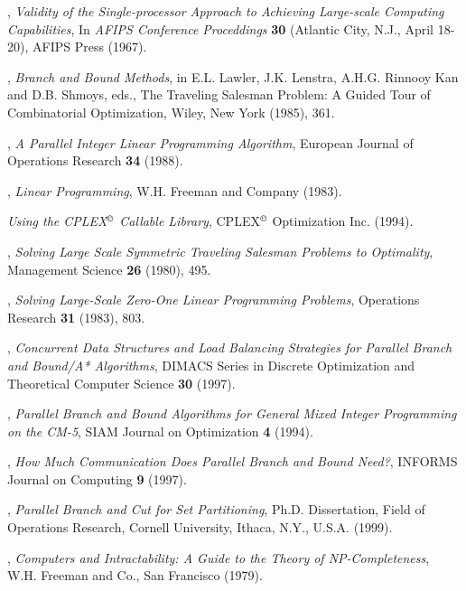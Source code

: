 \begin{thebibliography}{9}

,
{\em Validity of the Single-processor Approach to Achieving
Large-scale Computing Capabilities}, In {\em AFIPS Conference
Proceddings} {\bf 30} (Atlantic City, N.J., April 18-20), AFIPS 
Press (1967).

,
{\em Branch and Bound Methods}, in E.L. Lawler, J.K. Lenstra,
A.H.G. Rinnooy Kan and D.B. Shmoys, eds., The Traveling Salesman
Problem: A Guided Tour of Combinatorial Optimization, Wiley, New York
(1985), 361.

, {\em A
Parallel Integer Linear Programming Algorithm}, European Journal of
Operations Research {\bf 34} (1988).

, 
{\em Linear Programming},
W.H. Freeman and Company (1983).

{\em Using the CPLEX$^{\copyright}$ Callable Library},
CPLEX$^{\copyright}$ Optimization Inc. (1994).

, 
{\em Solving Large Scale Symmetric Traveling Salesman Problems to
Optimality}, Management Science {\bf 26} (1980), 495.

, 
{\em Solving Large-Scale Zero-One Linear Programming Problems},
Operations Research {\bf 31} (1983), 803.

, {\em Concurrent Data Structures and Load Balancing
Strategies for Parallel Branch and Bound/A* Algorithms}, DIMACS Series
in Discrete Optimization and Theoretical Computer Science {\bf 30} (1997).

, {\em Parallel Branch and Bound
Algorithms for General Mixed Integer Programming on the CM-5}, SIAM
Journal on Optimization {\bf 4} (1994).

, {\em How Much Communication Does
Parallel Branch and Bound Need?}, INFORMS
Journal on Computing {\bf 9} (1997).

,
{\em Parallel Branch and Cut for Set Partitioning},
Ph.D. Dissertation, Field of Operations Research,
Cornell University, Ithaca, N.Y., U.S.A. (1999).

, 
{\em Computers and Intractability: A Guide to the Theory of
NP-Completeness},
W.H. Freeman and Co., San Francisco (1979).                


\end{thebibliography}
